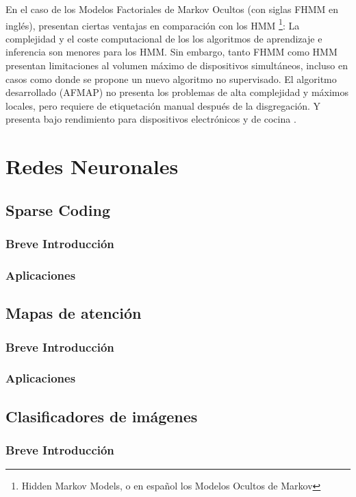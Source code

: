 En el caso de los Modelos Factoriales de Markov Ocultos (con siglas FHMM en inglés), presentan ciertas ventajas en comparación con los HMM \footnote{Hidden Markov Models, o en español los Modelos Ocultos de Markov}:
La complejidad y el coste computacional de los los algoritmos de aprendizaje e inferencia son menores para los HMM. Sin embargo, tanto FHMM como HMM presentan limitaciones al volumen máximo de dispositivos simultáneos, incluso en casos como \autocite{afmap2012} donde se propone un nuevo algoritmo no supervisado. El algoritmo desarrollado (AFMAP) no presenta los problemas de alta complejidad y máximos locales, pero requiere de etiquetación manual después de la disgregación. Y presenta bajo rendimiento para dispositivos electrónicos y de cocina \autocite[5]{NILMreview2017}.

\section{Redes Neuronales}

\subsection{Sparse Coding}
\subsubsection{Breve Introducción}
\autocite{stanfordSparse}

\subsubsection{Aplicaciones}

\subsection{Mapas de atención}
\subsubsection{Breve Introducción}
\subsubsection{Aplicaciones}

\subsection{Clasificadores de imágenes}
\subsubsection{Breve Introducción}
